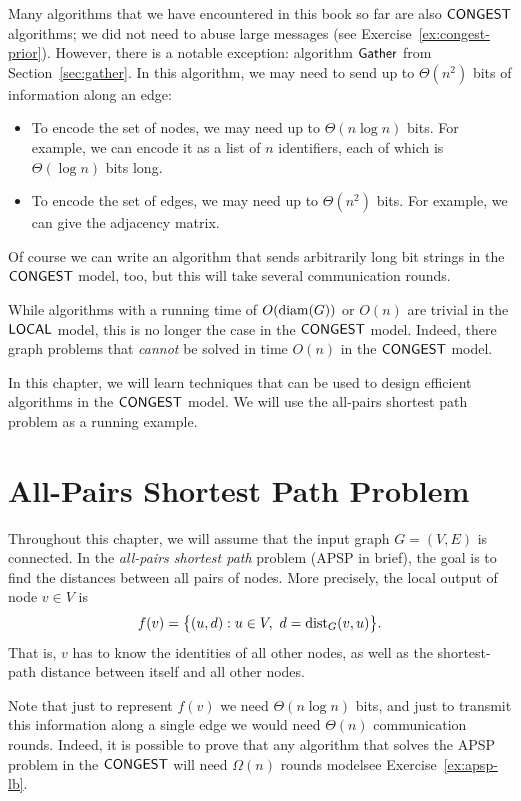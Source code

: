 Many algorithms that we have encountered in this book so far are also $\textup{\sffamily CONGEST}$ algorithms; we did not need to abuse large messages (see Exercise~\ref{ex:congest-prior}). However, there is a notable exception: algorithm $\textup{\sffamily Gather}$ from Section~\ref{sec:gather}. In this algorithm, we may need to send up to $\Theta(n^2)$ bits of information along an edge:
\begin{itemize}
    \item To encode the set of nodes, we may need up to $\Theta(n \log n)$ bits. For example, we can encode it as a list of $n$ identifiers, each of which is $\Theta(\log n)$ bits long.
    \item To encode the set of edges, we may need up to $\Theta(n^2)$ bits. For example, we can give the adjacency matrix.
\end{itemize}
Of course we can write an algorithm that sends arbitrarily long bit strings in the $\textup{\sffamily CONGEST}$ model, too, but this will take several communication rounds.

While algorithms with a running time of $O(\operatorname{diam}(G))$ or $O(n)$ are trivial in the $\textup{\sffamily LOCAL}$ model, this is no longer the case in the $\textup{\sffamily CONGEST}$ model. Indeed, there graph problems that \emph{cannot} be solved in time $O(n)$ in the $\textup{\sffamily CONGEST}$ model.

In this chapter, we will learn techniques that can be used to design efficient algorithms in the $\textup{\sffamily CONGEST}$ model. We will use the all-pairs shortest path problem as a running example.


\section{All-Pairs Shortest Path Problem}

Throughout this chapter, we will assume that the input graph $G = (V,E)$ is connected. In the \emph{all-pairs shortest path} problem (APSP in brief), the goal is to find the distances between all pairs of nodes. More precisely, the local output of node $v \in V$ is
\[
    f(v) = \bigl\{ (u, d) : u \in V,\ d = \operatorname{dist}_G(v, u) \bigr\}.
\]
That is, $v$ has to know the identities of all other nodes, as well as the shortest-path distance between itself and all other nodes.

Note that just to represent $f(v)$ we need $\Theta(n \log n)$ bits, and just to transmit this information along a single edge we would need $\Theta(n)$ communication rounds. Indeed, it is possible to prove that any algorithm that solves the APSP problem in the $\textup{\sffamily CONGEST}$ will need $\Omega(n)$ rounds model\mydash see Exercise~\ref{ex:apsp-lb}.

